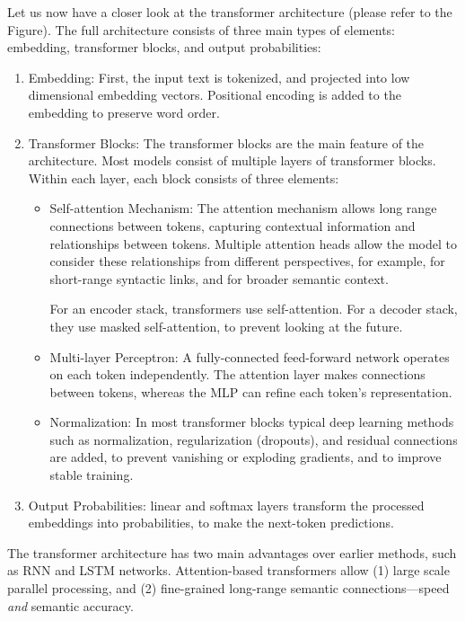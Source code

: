Let us now have a closer look at the transformer architecture (please refer to the Figure). The full architecture consists of three main types of elements: embedding, transformer blocks, and output probabilities:
\begin{enumerate}
\item Embedding: First, the input text is tokenized, and projected into low dimensional embedding vectors. Positional encoding is added to the embedding to preserve word order. 
\item Transformer Blocks: The transformer blocks are the main feature of the architecture. Most models consist of multiple layers of transformer blocks. Within each layer, each block consists of three elements:
\begin{itemize}
    \item Self-attention Mechanism: The attention mechanism allows long range connections between tokens, capturing contextual information and relationships between tokens. Multiple attention heads allow the model to consider these relationships from different perspectives, for example, for short-range syntactic links, and for  broader semantic context. 
    
    For an encoder stack, transformers use self-attention. For a decoder stack, they use masked self-attention, to prevent looking at the future.  
    \item Multi-layer Perceptron: A fully-connected feed-forward network  operates on each token independently. The attention layer makes connections  between tokens, whereas the MLP can refine each token's representation. 
    \item Normalization: In most transformer blocks typical deep learning methods such as normalization,  regularization (dropouts), and residual connections are added, to prevent vanishing or exploding gradients, and to improve stable training.     \end{itemize}
\item Output Probabilities: linear and softmax layers transform the processed embeddings into probabilities, to make the next-token predictions. 
\end{enumerate}
The transformer architecture has two main advantages over earlier methods, such as RNN and LSTM networks. %
Attention-based transformers allow (1) large scale parallel processing, and (2) fine-grained long-range semantic connections---speed {\em and} semantic accuracy. 

